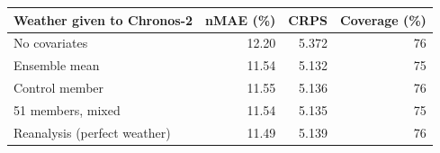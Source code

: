 \begin{tabular}{lrrr}
\toprule
Weather given to Chronos-2 & nMAE (\%) & CRPS & Coverage (\%) \\
\midrule
No covariates & 12.20 & 5.372 & 76 \\
\addlinespace[3pt]
Ensemble mean & 11.54 & 5.132 & 75 \\
Control member & 11.55 & 5.136 & 76 \\
51 members, mixed & 11.54 & 5.135 & 75 \\
\addlinespace[3pt]
Reanalysis (perfect weather) & 11.49 & 5.139 & 76 \\
\bottomrule
\end{tabular}
